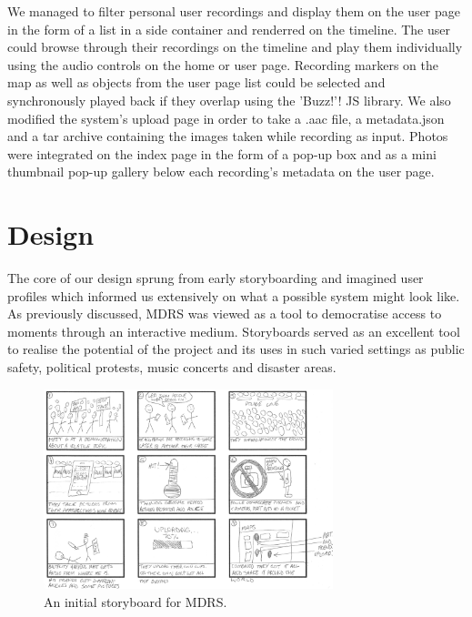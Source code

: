 \documentclass{l3proj}
\begin{document}
 We managed to filter personal user recordings and display them on the user page in the form of a list in a side container and renderred on the timeline.
 The user could browse through their recordings on the timeline and play them individually using the audio controls on the home or user page.
 Recording markers on the map as well as objects from the user page list could be selected and synchronously played back if they overlap using the 'Buzz!'! JS library.
 We also modified the system's upload page in order to take a .aac file, a metadata.json and a tar archive containing the images taken while recording as input.
 Photos were integrated on the index page in the form of a pop-up box and as a mini thumbnail pop-up gallery below each recording's metadata on the user page.




\chapter{Design}
\label{design}

The core of our design sprung from early storyboarding and imagined user
profiles which informed us extensively on what a possible system might look
like. As previously discussed, MDRS was viewed as a tool to democratise access to moments through an interactive medium. Storyboards served as an excellent tool to realise the potential of the project and its uses in such varied settings as public safety, political protests, music concerts and disaster areas.

\begin{figure}[ht!]
\centering
\includegraphics[width=0.75\textwidth]{images/ally-storyboard.jpg}
\caption{An initial storyboard for MDRS.}
\end{figure}
\end{document}
